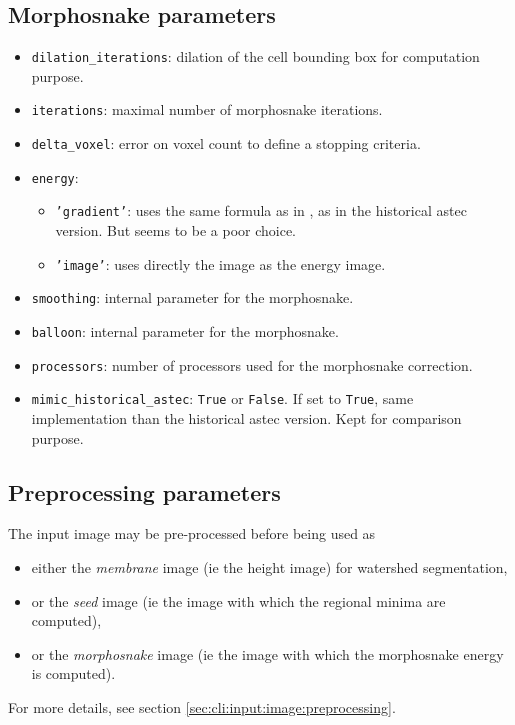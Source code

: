 \subsection{Morphosnake parameters}
\label{sec:cli:parameters:morphosnake}

\begin{itemize}
\itemsep -0.5ex
\item \texttt{dilation\_iterations}: 
  dilation of the cell bounding box for computation purpose.
\item \texttt{iterations}:
  maximal number of morphosnake iterations.
\item \texttt{delta\_voxel}: 
  error on voxel count to define a stopping criteria.
\item \texttt{energy}:
  \begin{itemize}
  \item \texttt{'gradient'}: uses the same formula as in 
  \cite{marquez-neil:pami:2014}, as in the historical 
  astec version. But seems to be a poor choice.
  \item \texttt{'image'}: uses directly the image as the energy image.
  \end{itemize}
\item \texttt{smoothing}:
  internal parameter for the morphosnake.
\item \texttt{balloon}:
  internal parameter for the morphosnake.
\item \texttt{processors}: number of processors used for the 
  morphosnake correction.
\item \texttt{mimic\_historical\_astec}:
  \texttt{True} or \texttt{False}. 
  If set to \texttt{True}, same implementation than the historical 
  astec version. Kept for comparison purpose.
\end{itemize}










\subsection{Preprocessing parameters}
\label{sec:cli:parameters:preprocessing}

The input image may be pre-processed before being used as
\begin{itemize}
\itemsep -0.5ex
\item either the \textit{membrane} image (ie the height image) for watershed segmentation,
\item or the \textit{seed} image (ie the image with which the regional minima are computed),
\item or the \textit{morphosnake} image (ie the image with which the morphosnake energy is computed).
\end{itemize}
For more details, see section \ref{sec:cli:input:image:preprocessing}.

